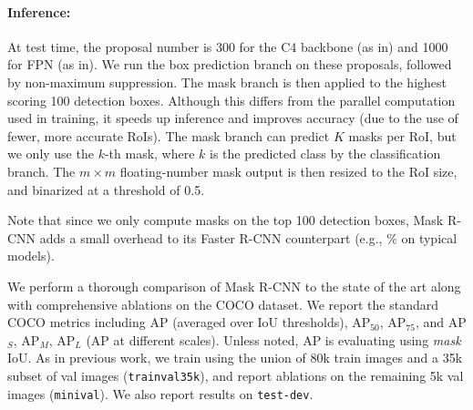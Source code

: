 \paragraph{Inference:} At test time, the proposal number is 300 for the C4 backbone (as in) and 1000 for FPN (as in). We run the box prediction branch on these proposals, followed by non-maximum suppression. The mask branch is then applied to the highest scoring 100 detection boxes. Although this differs from the parallel computation used in training, it speeds up inference and improves accuracy (due to the use of fewer, more accurate RoIs). The mask branch can predict $K$ masks per RoI, but we only use the $k$-th mask, where $k$ is the predicted class by the classification branch. The $m \times m$ floating-number mask output is then resized to the RoI size, and binarized at a threshold of 0.5.

Note that since we only compute masks on the top 100 detection boxes, Mask R-CNN adds a small overhead to its Faster R-CNN counterpart (e.g., \% on typical models).

\label{sec:results}

We perform a thorough comparison of Mask R-CNN to the state of the art along with comprehensive ablations on the COCO dataset. We report the standard COCO metrics including AP (averaged over IoU thresholds), AP$_{50}$, AP$_{75}$, and AP$_S$, AP$_M$, AP$_L$ (AP at different scales). Unless noted, AP is evaluating using \emph{mask} IoU. As in previous work, we train using the union of 80k train images and a 35k subset of val images (\texttt{trainval35k}), and report ablations on the remaining 5k val images (\texttt{minival}). We also report results on \texttt{test-dev}.


